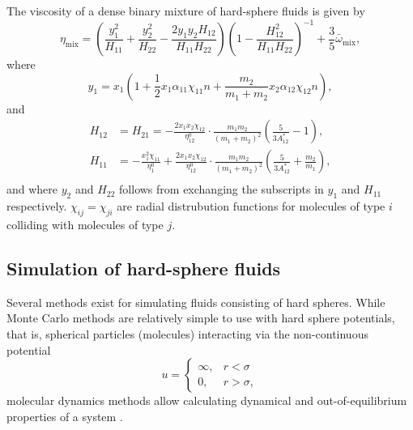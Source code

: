 The viscosity of a dense binary mixture of hard-sphere fluids is given by
\begin{equation}
    \eta_{\text{mix}} 
        = \left(
            \frac{y_1^2}{H_{11}} + \frac{y_2^2}{H_{22}} - \frac{2 y_1 y_2 H_{12}}{H_{11} H_{22}}
        \right)
        \left(
            1 - \frac{H_{12}^2}{H_{11} H_{22}}
        \right)^{-1}
        + \frac{3}{5} \bar{\omega}_{\text{mix}},
\end{equation}
where
\begin{equation}
    y_1 
        = x_1 \left(
            1 + \frac{1}{2} x_1 \alpha_{11} \chi_{11} n + \frac{m_2}{m_1 + m_2} x_2 \alpha_{12} \chi_{12} n
        \right), 
\end{equation}
and
\begin{equation}
    \begin{split}
        H_{12} &= H_{21}
                =   -\frac{2 x_1 x_2 \chi_{12}}{\eta^0_{12}}
                    \cdot \frac{m_1 m_2}{(m_1 + m_2)^2}
                    \left( \frac{5}{3A^*_{12}} - 1 \right), \\
        H_{11}
                &=  -\frac{x_1^2 \chi_{11}}{\eta^0_1}
                    +\frac{2 x_1 x_2 \chi_{12}}{\eta^0_{12}}
                    \cdot \frac{m_1 m_2}{(m_1 + m_2)^2}
                    \left( \frac{5}{3A^*_{12}} + \frac{m_2}{m_1} \right), \\
    \end{split}
\end{equation}
and where $y_2$ and $H_{22}$ follows from exchanging the subscripts in $y_1$ and $H_{11}$ respectively.
$\chi_{ij} = \chi_{ji}$ are radial distrubution functions for molecules of type $i$ colliding with molecules of type $j$.


\subsection{Simulation of hard-sphere fluids}
Several methods exist for simulating fluids consisting of hard spheres.
While Monte Carlo methods are relatively simple to use with hard sphere potentials, 
that is, spherical particles (molecules) interacting via the non-continuous potential 
\begin{equation}
    u = 
    \begin{cases}
        \infty, & r < \sigma \\
        0, & r > \sigma,
    \end{cases}
\end{equation}
molecular dynamics methods allow calculating dynamical and out-of-equilibrium properties of a system \cite{ref:allen:MD_sim}.

